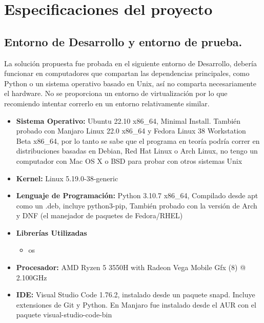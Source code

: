 \documentclass[a4paper]{article}
\begin{document}
\section{Especificaciones del proyecto}

\subsection{Entorno de Desarrollo y entorno de prueba.}

La solución propuesta fue probada en el siguiente entorno de Desarrollo, debería funcionar en
computadores que compartan las dependencias principales, como Python o un sistema operativo basado
en Unix, así no comparta necesariamente el hardware. No se proporciona un entorno de virtualización
por lo que recomiendo intentar correrlo en un entorno relativamente similar.

\begin{itemize}
    \item \textbf{Sistema Operativo: } Ubuntu 22.10 x86\_64, Minimal Install. También probado con Manjaro Linux 22.0 x86\_64 y Fedora
    Linux 38 Workstation Beta x86\_64, por lo tanto se sabe que el programa en teoría podría correr en distribuciones basadas en Debian,
    Red Hat Linux o Arch Linux, no tengo un computador con Mac OS X o BSD para probar con otros sistemas Unix
    \item \textbf{Kernel: }Linux 5.19.0-38-generic
    \item \textbf{Lenguaje de Programación: }Python 3.10.7 x86\_64, Compilado desde apt como un .deb, incluye python3-pip,
    También probado con la versión de Arch y DNF (el manejador de paquetes de Fedora/RHEL)
    \item \textbf{Librerías Utilizadas}
    \begin{itemize}
        \item os
    \end{itemize}
    \item \textbf{Procesador: }AMD Ryzen 5 3550H with Radeon Vega Mobile Gfx (8) @ 2.100GHz 
    \item \textbf{IDE: } Visual Studio Code 1.76.2, instalado desde un paquete snapd. Incluye extensiones
    de Git y Python. En Manjaro fue instalado desde el AUR con el paquete visual-studio-code-bin
\end{itemize}
\end{document}
